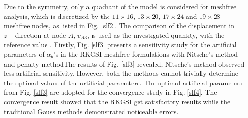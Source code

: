 Due to the symmetry, only a quadrant of the model is considered for meshfree analysis, which is discretized by the $11\times 16$, $13\times 20$, $17\times 24$ and $19\times28$ meshfree nodes, as listed in Fig. \ref{slf2}. The comparison of the displacement in $z-$direction at node $A$, $v_{A3}$, is used as the investigated quantity, with the reference value \DIFdelbegin {}\DIFdelend \DIFaddbegin {}\DIFaddend . Firstly, Fig. \ref{slf3} presents a sensitivity study for the artificial parameters of \DIFdelbegin {}\DIFdelend \DIFaddbegin {}\DIFaddend $\alpha_\theta$'s in the RKGSI meshfree formulations with Nitsche's method and penalty method\DIFdelbegin {}\DIFdelend \DIFaddbegin {}\DIFaddend The results of Fig. \ref{slf3} revealed, Nitsche's method observed less artificial sensitivity. However, both the methods cannot trivially determine the optimal values of the artificial parameters. The optimal artificial parameters from Fig. \ref{slf3} are adopted for the convergence study in Fig. \ref{slf4}. The convergence result showed that the RKGSI get satisfactory results while the traditional Gauss methods demonstrated noticeable errors.

